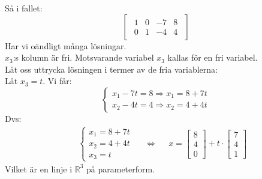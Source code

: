 Så i fallet:
\[
\begin{bmatrix}
\begin{array}{ccc|c}
    1 & 0 & -7 & 8\\
    0 & 1 & -4 & 4
\end{array}
\end{bmatrix}
\]
Har vi oändligt många lösningar.\\
$x_3$:s kolumn är fri. Motsvarande variabel $x_3$ kallas för en fri variabel.\\
Låt oss uttrycka lösningen i termer av de fria variablerna:\\
Låt $x_3 = t$. Vi får:
\[
\begin{cases}
    x_1 - 7t = 8 \Rightarrow x_1 = 8 + 7t\\
    x_2 - 4t = 4 \Rightarrow x_2 = 4 + 4t
\end{cases}
\]
Dvs:
\begin{align*}
&&\begin{cases}
    x_1 = 8 + 7t\\
    x_2 = 4 + 4t\\
    x_3 = t
\end{cases}
&&\Longleftrightarrow
&&x = \begin{bmatrix} 8\\4\\0 \end{bmatrix} + t \cdot \begin{bmatrix} 7\\4\\1 \end{bmatrix}
\end{align*}
Vilket är en linje i $\mathbb{R}^3$ på parameterform.
